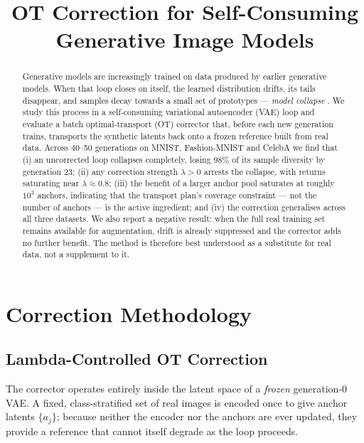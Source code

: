 \documentclass{article}
\title{\textbf{OT Correction for Self-Consuming Generative Image Models}}
\begin{document}
\setlength{\droptitle}{-2cm}
\date{}
\maketitle
\vspace*{-2.5cm}


\begin{abstract}
\noindent
Generative models are increasingly trained on data produced by earlier generative
models. When that loop closes on itself, the learned distribution drifts, its tails
disappear, and samples decay towards a small set of prototypes --- \emph{model
collapse} \cite{shumailov2024curse, alemohammad2024selfconsuming}. We study this
process in a self-consuming variational autoencoder (VAE) \cite{kingma2014vae} loop
and evaluate a batch optimal-transport (OT) corrector \cite{gillman2024selfcorrecting}
that, before each new generation trains, transports the synthetic latents back onto a
frozen reference built from real data. Across 40--50 generations on MNIST, Fashion-MNIST and CelebA
we find that (i) an uncorrected loop collapses completely, losing $98\%$ of its
sample diversity by generation $23$; (ii) any correction strength $\lambda > 0$
arrests the collapse, with returns saturating near $\lambda \approx 0.8$; (iii) the
benefit of a larger anchor pool saturates at roughly $10^3$ anchors, indicating that
the transport plan's coverage constraint --- not the number of anchors --- is the
active ingredient; and (iv) the correction generalises across all three datasets. We
also report a negative result: when the full real training set remains available for
augmentation, drift is already suppressed and the corrector adds no further benefit.
The method is therefore best understood as a substitute for real data, not a
supplement to it.
\end{abstract}


\section{Correction Methodology}
\subsection{Lambda-Controlled OT Correction}

The corrector operates entirely inside the latent space of a \emph{frozen}
generation-0 VAE. A fixed, class-stratified set of real images is encoded once to
give anchor latents $\{a_j\}$; because neither the encoder nor the anchors are ever
updated, they provide a reference that cannot itself degrade as the loop proceeds.
\end{document}

